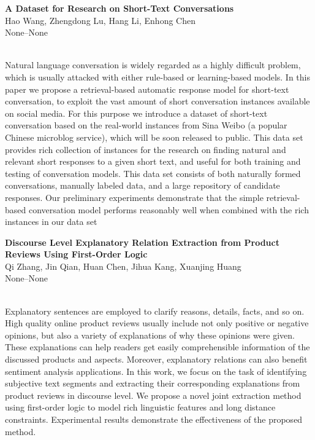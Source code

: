 \documentclass[twoside,makeidx]{book}
\renewcommand{\normalsize}{\fontsize{8}{9}\selectfont}
\renewcommand{\small}{\fontsize{7}{8}\selectfont}
\begin{document}
\par\vspace{2em}\noindent%
\begin{minipage}{\linewidth}%
\begin{center}
\textbf{\normalsize A Dataset for Research on Short-Text Conversations}\\
\normalsize  Hao Wang,  Zhengdong Lu,  Hang Li,  Enhong Chen\\
{\small None--None}\\
\end{center}
\end{minipage}\\[0.5em]
\nopagebreak%
\noindent%
{\small Natural language conversation is widely regarded as a highly difficult problem, which is usually attacked with either rule-based or learning-based models. In this paper we propose a retrieval-based automatic response model for short-text conversation, to exploit the vast amount of short conversation instances available on social media. For this purpose we introduce a dataset of short-text conversation based on the real-world instances from Sina Weibo (a popular Chinese microblog service), which will be soon released to public. This data set provides rich collection of instances for the research on finding natural and relevant short responses to a given short text, and useful for both training and testing of conversation models. This data set consists of both naturally formed conversations, manually labeled data, and a large repository of candidate responses. Our preliminary experiments demonstrate that the simple retrieval-based conversation model performs reasonably well when combined with the rich instances in our data set}
\par\vspace{2em}\noindent%
\begin{minipage}{\linewidth}%
\begin{center}
\textbf{\normalsize Discourse Level Explanatory Relation Extraction from Product Reviews Using First-Order Logic}\\
\normalsize  Qi Zhang,  Jin Qian,  Huan Chen,  Jihua Kang,  Xuanjing Huang\\
{\small None--None}\\
\end{center}
\end{minipage}\\[0.5em]
\nopagebreak%
\noindent%
{\small Explanatory sentences are employed to clarify reasons, details, facts, and so on. High quality online product reviews usually include not only positive or negative opinions, but also a variety of explanations of why these opinions were given.  These explanations can  help readers get easily comprehensible information of the discussed products and aspects. Moreover, explanatory relations can also benefit sentiment analysis applications. In this work, we focus on the task of identifying subjective text segments and extracting their corresponding explanations from product reviews in discourse level. We propose a novel joint extraction method using first-order logic to model rich linguistic features and long distance constraints. Experimental results demonstrate the effectiveness of the proposed method.}
\end{document}
